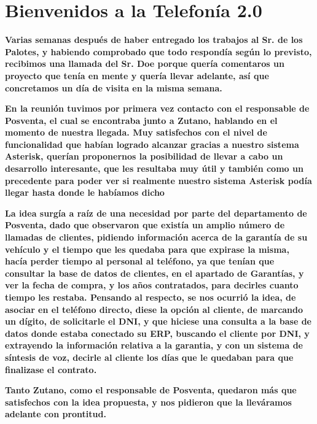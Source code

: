 
\section{Bienvenidos a la Telefonía 2.0}

\textbf{Varias semanas después de haber entregado los trabajos al Sr. de los Palotes, y habiendo comprobado que todo respondía según lo previsto, recibimos una llamada del Sr. Doe porque quería comentaros un proyecto que tenía en mente y quería llevar adelante, así que concretamos un día de visita en la misma semana.}

\textbf{En la reunión tuvimos por primera vez contacto con el responsable de Posventa, el cual se encontraba junto a Zutano, hablando en el momento de nuestra llegada. Muy satisfechos con el nivel de funcionalidad que habían logrado alcanzar gracias a nuestro sistema Asterisk, querían proponernos la posibilidad de llevar a cabo un desarrollo interesante, que les resultaba muy útil y también como un precedente para poder ver si realmente nuestro sistema Asterisk podía llegar hasta donde le habíamos dicho}

\textbf{La idea surgía a raíz de una necesidad por parte del departamento de Posventa, dado que observaron que existía un amplio número de llamadas de clientes, pidiendo información acerca de la garantía de su vehículo y el tiempo que les quedaba para que expirase la misma, hacía perder tiempo al personal al teléfono, ya que tenían que consultar la base de datos de clientes, en el apartado de Garantías, y ver la fecha de compra, y los años contratados, para decirles cuanto tiempo les restaba. Pensando al respecto, se nos ocurrió la idea, de asociar en el teléfono directo, diese la opción al cliente, de marcando un dígito, de solicitarle el DNI, y que hiciese una consulta a la base de datos donde estaba conectado su ERP, buscando el cliente por DNI, y extrayendo la información relativa a la garantia, y con un sistema de síntesis de voz, decirle al cliente los días que le quedaban para que finalizase el contrato.}

\textbf{Tanto Zutano, como el responsable de Posventa, quedaron más que satisfechos con la idea propuesta, y nos pidieron que la lleváramos adelante con prontitud.}

